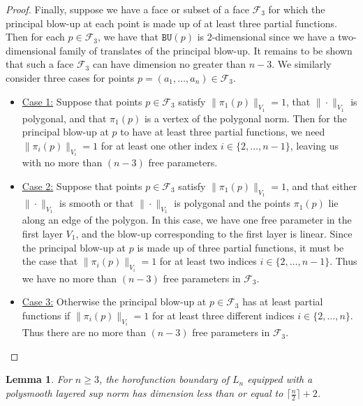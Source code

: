\documentclass{article}
\newtheorem{lemma}[theorem]{Lemma}
\theoremstyle{definition}
\newcommand{\BU}{\mathtt{BU}}
\newcommand{\norm}[1]{\|#1\|}
\newcommand{\cF}{{\mathcal F}}
\begin{document}
\begin{proof}
Finally, suppose we have a face or subset of a face $\cF_3$ for which the principal blow-up at each point is made up of at least three partial functions. Then for each $p \in \cF_3$, we have that $\BU(p)$ is 2-dimensional since we have a two-dimensional family of translates of the principal blow-up. It remains to be shown that such a face $\cF_3$ can have dimension no greater than $n-3$. We similarly consider three cases for points $p= (a_1, \ldots, a_n) \in \cF_3$.
\begin{itemize}
\item \underline{Case 1:} Suppose that points $p \in \cF_3$ satisfy $\norm{\pi_1(p)}_{V_1} = 1$, that $\norm{\cdot}_{V_1}$ is polygonal, and that $\pi_1(p)$ is a vertex of the polygonal norm. Then for the principal blow-up at $p$ to have at least three partial functions, we need $\norm{\pi_i(p)}_{V_i} = 1$ for at least one other index $i \in \{2, \ldots, n-1\}$, leaving us with no more than $(n-3)$ free parameters.

\item \underline{Case 2:} Suppose that points $p \in \cF_3$ satisfy $\norm{\pi_1(p)}_{V_1} = 1$, and that either $\norm{\cdot}_{V_1}$ is smooth or that $\norm{\cdot}_{V_1}$ is polygonal and the points $\pi_1(p)$ lie along an edge of the polygon. In this case, we have one free parameter in the first layer $V_1$, and the blow-up corresponding to the first layer is linear. Since the principal blow-up at $p$ is made up of three partial functions, it must be the case that $\norm{\pi_i(p)}_{V_i} = 1$ for at least two indices $i \in \{2, \ldots, n-1\}$. Thus we have no more than $(n-3)$ free parameters in $\cF_3$.

\item \underline{Case 3:} Otherwise the principal blow-up at $p \in \cF_3$ has at least partial functions if $\norm{\pi_i(p)}_{V_i} = 1$ for at least three different indices $i \in \{2, \ldots, n\}.$ Thus there are no more than $(n-3)$ free parameters in $\cF_3$. 
\end{itemize}
\end{proof}

\begin{lemma}
For $n\geq 3$, the horofunction boundary of $L_n$ equipped with a polysmooth layered sup norm has dimension less than or equal to $\lceil\frac{ n }{2}\rceil + 2$.
\label{lemma:otherBound}
\end{lemma}
\end{document}
